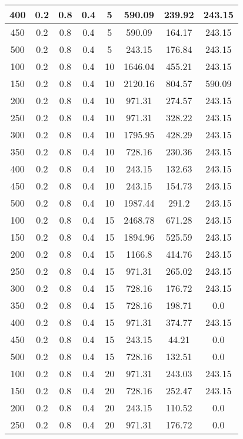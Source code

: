 \documentclass[a4paper, 12pt]{extreport}
\begin{document}
\begin{itemize}
\begin{longtable}{|c|c|c|c|c|c|c|c|}
			400 & 0.2 & 0.8 & 0.4 & 5 & 590.09 & 239.92 & 243.15 \\\hline
			450 & 0.2 & 0.8 & 0.4 & 5 & 590.09 & 164.17 & 243.15 \\\hline
			500 & 0.2 & 0.8 & 0.4 & 5 & 243.15 & 176.84 & 243.15 \\\hline
			100 & 0.2 & 0.8 & 0.4 & 10 & 1646.04 & 455.21 & 243.15 \\\hline
			150 & 0.2 & 0.8 & 0.4 & 10 & 2120.16 & 804.57 & 590.09 \\\hline
			200 & 0.2 & 0.8 & 0.4 & 10 & 971.31 & 274.57 & 243.15 \\\hline
			250 & 0.2 & 0.8 & 0.4 & 10 & 971.31 & 328.22 & 243.15 \\\hline
			300 & 0.2 & 0.8 & 0.4 & 10 & 1795.95 & 428.29 & 243.15 \\\hline
			350 & 0.2 & 0.8 & 0.4 & 10 & 728.16 & 230.36 & 243.15 \\\hline
			400 & 0.2 & 0.8 & 0.4 & 10 & 243.15 & 132.63 & 243.15 \\\hline
			450 & 0.2 & 0.8 & 0.4 & 10 & 243.15 & 154.73 & 243.15 \\\hline
			500 & 0.2 & 0.8 & 0.4 & 10 & 1987.44 & 291.2 & 243.15 \\\hline
			100 & 0.2 & 0.8 & 0.4 & 15 & 2468.78 & 671.28 & 243.15 \\\hline
			150 & 0.2 & 0.8 & 0.4 & 15 & 1894.96 & 525.59 & 243.15 \\\hline
			200 & 0.2 & 0.8 & 0.4 & 15 & 1166.8 & 414.76 & 243.15 \\\hline
			250 & 0.2 & 0.8 & 0.4 & 15 & 971.31 & 265.02 & 243.15 \\\hline
			300 & 0.2 & 0.8 & 0.4 & 15 & 728.16 & 176.72 & 243.15 \\\hline
			350 & 0.2 & 0.8 & 0.4 & 15 & 728.16 & 198.71 & 0.0 \\\hline
			400 & 0.2 & 0.8 & 0.4 & 15 & 971.31 & 374.77 & 243.15 \\\hline
			450 & 0.2 & 0.8 & 0.4 & 15 & 243.15 & 44.21 & 0.0 \\\hline
			500 & 0.2 & 0.8 & 0.4 & 15 & 728.16 & 132.51 & 0.0 \\\hline
			100 & 0.2 & 0.8 & 0.4 & 20 & 971.31 & 243.03 & 243.15 \\\hline
			150 & 0.2 & 0.8 & 0.4 & 20 & 728.16 & 252.47 & 243.15 \\\hline
			200 & 0.2 & 0.8 & 0.4 & 20 & 243.15 & 110.52 & 0.0 \\\hline
			250 & 0.2 & 0.8 & 0.4 & 20 & 971.31 & 176.72 & 0.0 \\\hline

\end{longtable}
\end{itemize}
\end{document}
